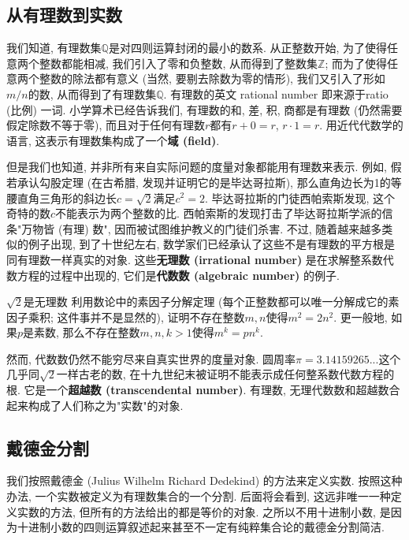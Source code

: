 
\subsection{从有理数到实数}

我们知道, 有理数集$\mathbb{Q}$是对四则运算封闭的最小的数系. 从正整数开始, 为了使得任意两个整数都能相减, 我们引入了零和负整数, 从而得到了整数集$\mathbb{Z}$; 而为了使得任意两个整数的除法都有意义 (当然, 要剔去除数为零的情形), 我们又引入了形如$m/n$的数, 从而得到了有理数集$\mathbb{Q}$. 有理数的英文 rational number 即来源于ratio (比例) 一词. 小学算术已经告诉我们, 有理数的和, 差, 积, 商都是有理数 (仍然需要假定除数不等于零), 而且对于任何有理数$r$都有$r+0=r$, $r\cdot1=r$. 用近代代数学的语言, 这表示有理数集构成了一个\textbf{域 (field)}.

但是我们也知道, 并非所有来自实际问题的度量对象都能用有理数来表示. 例如, 假若承认勾股定理 (在古希腊, 发现并证明它的是毕达哥拉斯), 那么直角边长为1的等腰直角三角形的斜边长$c=\sqrt{2}$满足$c^2=2$. 毕达哥拉斯的门徒西帕索斯发现, 这个奇特的数$c$不能表示为两个整数的比. 西帕索斯的发现打击了毕达哥拉斯学派的信条"万物皆 (有理) 数", 因而被试图维护教义的门徒们杀害. 不过, 随着越来越多类似的例子出现, 到了十世纪左右, 数学家们已经承认了这些不是有理数的平方根是同有理数一样真实的对象. 这些\textbf{无理数 (irrational number)} 是在求解整系数代数方程的过程中出现的, 它们是\textbf{代数数 (algebraic number)} 的例子.

\begin{exercise}{$\sqrt{2}$是无理数}
利用数论中的素因子分解定理 (每个正整数都可以唯一分解成它的素因子乘积; 这件事并不是显然的), 证明不存在整数$m,n$使得$m^2=2n^2$. 更一般地, 如果$p$是素数, 那么不存在整数$m,n,k>1$使得$m^k=pn^k$.
\end{exercise}

然而, 代数数仍然不能穷尽来自真实世界的度量对象. 圆周率$\pi=3.14159265...$这个几乎同$\sqrt{2}$一样古老的数, 在十九世纪末被证明不能表示成任何整系数代数方程的根. 它是一个\textbf{超越数 (transcendental number)}. 有理数, 无理代数数和超越数合起来构成了人们称之为"实数"的对象.

\subsection{戴德金分割}
我们按照戴德金 (Julius Wilhelm Richard Dedekind) 的方法来定义实数. 按照这种办法, 一个实数被定义为有理数集合的一个分割. 后面将会看到, 这远非唯一一种定义实数的方法, 但所有的方法给出的都是等价的对象. 之所以不用十进制小数, 是因为十进制小数的四则运算叙述起来甚至不一定有纯粹集合论的戴德金分割简洁.

